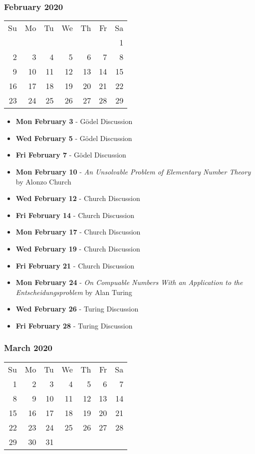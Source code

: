 \subsubsection*{February 2020}
\begin{tabular}{rrrrrrr}
Su & Mo & Tu & We & Th & Fr & Sa\\
   &    &    &    &    &    &  1\\ 
 2 &  3 &  4 &  5 &  6 &  7 &  8\\ 
 9 & 10 & 11 & 12 & 13 & 14 & 15\\ 
16 & 17 & 18 & 19 & 20 & 21 & 22\\ 
23 & 24 & 25 & 26 & 27 & 28 & 29\\ 
\end{tabular}
\begin{itemize}
\item\textbf{Mon February  3} - G\"odel Discussion
\item\textbf{Wed February  5} - G\"odel Discussion
\item\textbf{Fri February  7} - G\"odel Discussion
\item\textbf{Mon February 10} - {\em An Unsolvable Problem of
Elementary Number Theory} by Alonzo Church
\item\textbf{Wed February 12} - Church Discussion
\item\textbf{Fri February 14} - Church Discussion
\item\textbf{Mon February 17} - Church Discussion
\item\textbf{Wed February 19} - Church Discussion
\item\textbf{Fri February 21} - Church Discussion
\item\textbf{Mon February 24} - {\em On Compuable Numbers With an
Application to the Entscheidungsproblem} by Alan Turing
\item\textbf{Wed February 26} - Turing Discussion
\item\textbf{Fri February 28} - Turing Discussion
\end{itemize}
\hrulefill

\subsubsection*{March 2020}
\begin{tabular}{rrrrrrr}
Su & Mo & Tu & We & Th & Fr & Sa\\
 1 &  2 &  3 &  4 &  5 &  6 &  7\\ 
 8 &  9 & 10 & 11 & 12 & 13 & 14\\ 
15 & 16 & 17 & 18 & 19 & 20 & 21\\ 
22 & 23 & 24 & 25 & 26 & 27 & 28\\
29 & 30 & 31 &    &    &    & \\
\end{tabular}

